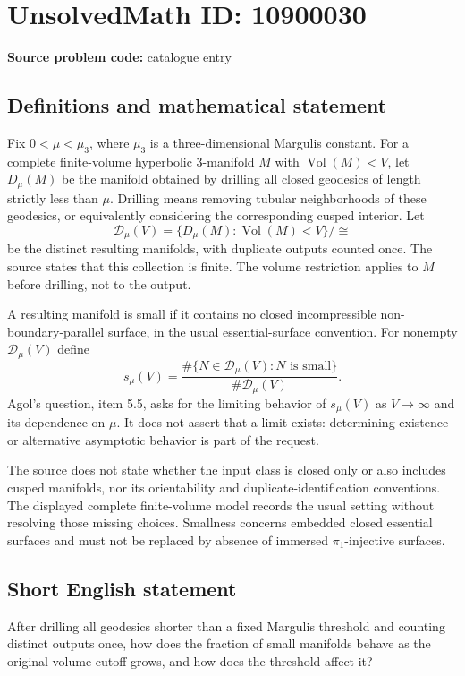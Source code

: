 \documentclass[11pt]{article}
\begin{document}
\section*{UnsolvedMath ID: 10900030}
\textbf{Source problem code:} catalogue entry
\subsection{Definitions and mathematical statement}
Fix $0<\mu<\mu_3$, where $\mu_3$ is a three-dimensional Margulis constant. For a complete finite-volume hyperbolic $3$-manifold $M$ with $\operatorname{Vol}(M)<V$, let $D_\mu(M)$ be the manifold obtained by drilling all closed geodesics of length strictly less than $\mu$. Drilling means removing tubular neighborhoods of these geodesics, or equivalently considering the corresponding cusped interior. Let
\[
 \mathcal D_\mu(V)=\{D_\mu(M):\operatorname{Vol}(M)<V\}/\cong
\]
be the distinct resulting manifolds, with duplicate outputs counted once. The source states that this collection is finite. The volume restriction applies to $M$ before drilling, not to the output.

A resulting manifold is small if it contains no closed incompressible non-boundary-parallel surface, in the usual essential-surface convention. For nonempty $\mathcal D_\mu(V)$ define
\[
 s_\mu(V)=
 \frac{\#\{N\in\mathcal D_\mu(V):N\text{ is small}\}}
 {\#\mathcal D_\mu(V)}.
\]
Agol's question, item 5.5, asks for the limiting behavior of $s_\mu(V)$ as $V\to\infty$ and its dependence on $\mu$. It does not assert that a limit exists: determining existence or alternative asymptotic behavior is part of the request.

The source does not state whether the input class is closed only or also includes cusped manifolds, nor its orientability and duplicate-identification conventions. The displayed complete finite-volume model records the usual setting without resolving those missing choices. Smallness concerns embedded closed essential surfaces and must not be replaced by absence of immersed $\pi_1$-injective surfaces.
\subsection{Short English statement}
After drilling all geodesics shorter than a fixed Margulis threshold and counting distinct outputs once, how does the fraction of small manifolds behave as the original volume cutoff grows, and how does the threshold affect it?
\end{document}
